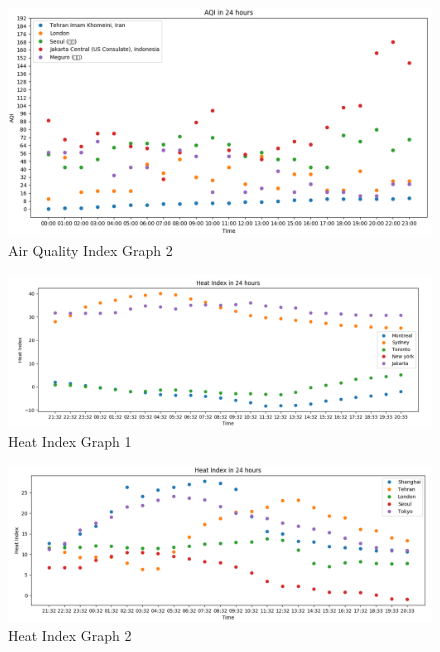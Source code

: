 \documentclass[12pt]{article}
\begin{document}
\begin{figure}[h]
	\centering
	\includegraphics[scale=0.4]{aqi-graph-2}
	\caption{Air Quality Index Graph 2}
\end{figure}

\begin{figure}[h]
	\centering
	\includegraphics[scale=0.4]{hi-graph-1}
	\caption{Heat Index Graph 1}
\end{figure}

\begin{figure}[h]
	\centering
	\includegraphics[scale=0.4]{hi-graph-2}
	\caption{Heat Index Graph 2}
\end{figure}
\end{document}
